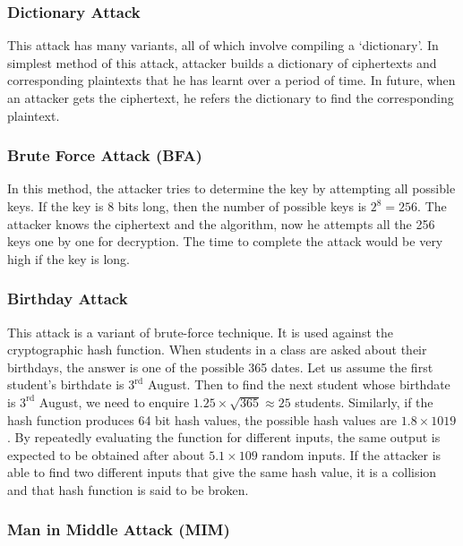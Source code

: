 \documentclass[british]{article}
\begin{document}
\subsubsection{Dictionary Attack}

This attack has many variants, all of which involve compiling a \textquoteleft dictionary\textquoteright .
In simplest method of this attack, attacker builds a dictionary of
ciphertexts and corresponding plaintexts that he has learnt over a
period of time. In future, when an attacker gets the ciphertext, he
refers the dictionary to find the corresponding plaintext.

\subsubsection{Brute Force Attack (BFA)}

In this method, the attacker tries to determine the key by attempting
all possible keys. If the key is 8 bits long, then the number of possible
keys is $2^8 = 256$. The attacker knows the ciphertext and the algorithm,
now he attempts all the 256 keys one by one for decryption. The time
to complete the attack would be very high if the key is long.

\subsubsection{Birthday Attack}

This attack is a variant of brute-force technique. It is used against
the cryptographic hash function. When students in a class are asked
about their birthdays, the answer is one of the possible 365 dates.
Let us assume the first student's birthdate is $3^{\text{rd}}$ August.
Then to find the next student whose birthdate is $3^{\text{rd}}$
August, we need to enquire $\displaystyle 1.25 \times \sqrt{365} \approx 25$
students. Similarly, if the hash function produces 64 bit hash values,
the possible hash values are $1.8\times1019$. By repeatedly evaluating
the function for different inputs, the same output is expected to
be obtained after about $5.1\times109$ random inputs. If the attacker
is able to find two different inputs that give the same hash value,
it is a collision and that hash function is said to be broken.

\subsubsection{Man in Middle Attack (MIM)}
\end{document}
